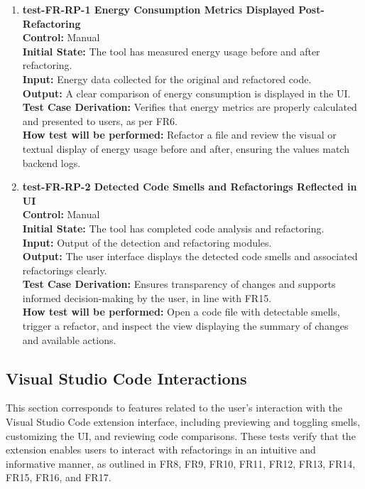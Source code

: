 \documentclass[12pt, titlepage]{article}
\begin{document}
\begin{enumerate}
  \item \textbf{test-FR-RP-1 Energy Consumption Metrics Displayed Post-Refactoring} \\[2mm]
    \textbf{Control:} Manual \\
    \textbf{Initial State:} The tool has measured energy usage before and after refactoring. \\
    \textbf{Input:} Energy data collected for the original and refactored code. \\
    \textbf{Output:} A clear comparison of energy consumption is displayed in the UI. \\
    \textbf{Test Case Derivation:} Verifies that energy metrics are properly calculated and presented to users, as per FR6. \\
    \textbf{How test will be performed:} Refactor a file and review the visual or textual display of energy usage before and after, ensuring the values match backend logs.

  \item \textbf{test-FR-RP-2 Detected Code Smells and Refactorings Reflected in UI} \\[2mm]
    \textbf{Control:} Manual \\
    \textbf{Initial State:} The tool has completed code analysis and refactoring. \\
    \textbf{Input:} Output of the detection and refactoring modules. \\
    \textbf{Output:} The user interface displays the detected code smells and associated refactorings clearly. \\
    \textbf{Test Case Derivation:} Ensures transparency of changes and supports informed decision-making by the user, in line with FR15. \\
    \textbf{How test will be performed:} Open a code file with detectable smells, trigger a refactor, and inspect the view displaying the summary of changes and available actions.
\end{enumerate}

\subsection{Visual Studio Code Interactions}

This section corresponds to features related to the user's interaction with the Visual Studio Code extension interface, including previewing and toggling smells, customizing the UI, and reviewing code comparisons. These tests verify that the extension enables users to interact with refactorings in an intuitive and informative manner, as outlined in FR8, FR9, FR10, FR11, FR12, FR13, FR14, FR15, FR16, and FR17.
\end{document}
